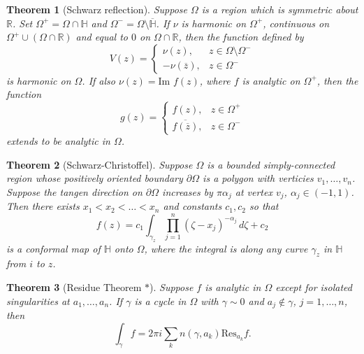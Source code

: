 \documentclass[12pt]{article}
\newtheorem{sats}{Theorem}
\theoremstyle{definition}
\renewcommand{\H}{\mathbb{H}}      %
\newcommand{\real}{\mathbb{R}}   %
\renewcommand{\Im}{\text{Im }}
\begin{document}
\begin{sats}[Schwarz reflection]
    Suppose $\Omega$ is a region which is symmetric about $\real$. Set $\Omega^+=\Omega\cap\H$ and $\Omega^-=\Omega\setminus\overline{\H}$. If $\nu$ is harmonic on $\Omega^+$, continuous on $\Omega^+\cup(\Omega\cap\real)$ and equal to $0$ on $\Omega\cap\real$, then the function defined by
    \begin{equation*}
        V(z)=\begin{cases}
            \nu(z),&z\in\Omega\setminus\Omega^-\\
            -\nu(\overline{z}),&z\in \Omega^-
        \end{cases}
    \end{equation*}
    is harmonic on $\Omega$. If also $\nu(z)=\Im f(z)$, where $f$ is analytic on $\Omega^+$, then the function
    \begin{equation*}
        g(z)=\begin{cases}
            f(z),&z\in\Omega^+\\
            \overline{f(\overline{z})},&z\in \Omega^-
        \end{cases}
    \end{equation*}
    extends to be analytic in $\Omega$.
\end{sats}

\begin{sats}[Schwarz-Christoffel]
    Suppose $\Omega$ is a bounded simply-connected region whose positively oriented boundary $\partial\Omega$ is a polygon with verticies $v_1,\dots,v_n$. Suppose the tangen direction on $\partial\Omega$ increases by $\pi\alpha_j$ at vertex $v_j$, $\alpha_j\in(-1,1)$. Then there exists $x_1<x_2<\dots<x_n$ and constants $c_1,c_2$ so that
    \begin{equation*}
        f(z) = c_1\int_{\gamma_z} \prod_{j=1}^n (\zeta-x_j)^{-\alpha_j}\,d\zeta +c_2
    \end{equation*}
    is a conformal map of $\H$ onto $\Omega$, where the integral is along any curve $\gamma_z$ in $\H$ from $i$ to $z$.
\end{sats}

\begin{sats}[Residue Theorem $*$]
    Suppose $f$ is analytic in $\Omega$ except for isolated singularities at $a_1,\dots,a_n$. If $\gamma$ is a cycle in $\Omega$ with $\gamma\sim 0$ and $a_j\notin\gamma$, $j=1,\dots,n$, then
    \begin{equation*}
        \int_\gamma f=2\pi i\sum_{k} n(\gamma,a_k)\text{Res}_{a_k} f.
    \end{equation*}
\end{sats}
\end{document}
